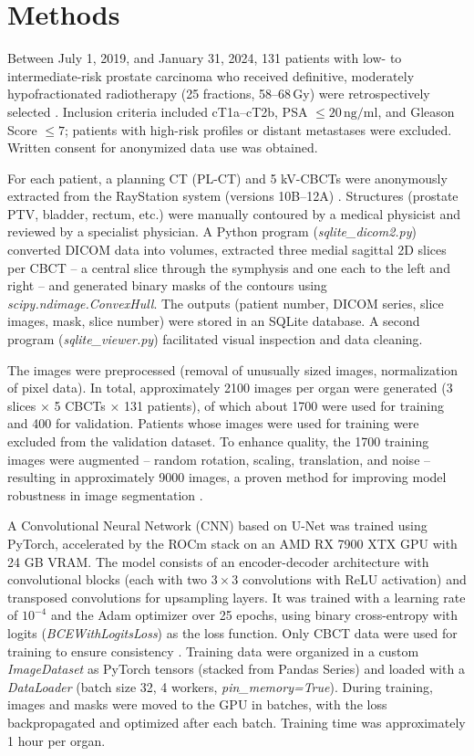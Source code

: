 \documentclass{article}
\begin{document}
\section{Methods}
Between July 1, 2019, and January 31, 2024, 131 patients with low- to
intermediate-risk prostate carcinoma who received definitive, moderately
hypofractionated radiotherapy (25 fractions, 58–68\,Gy) were retrospectively
selected \citep{ethik2024}. Inclusion criteria included cT1a–cT2b, PSA \(\leq
20\,\text{ng/ml}\), and Gleason Score \(\leq 7\); patients with high-risk
profiles or distant metastases were excluded. Written consent for anonymized
data use was obtained.

For each patient, a planning CT (PL-CT) and 5 kV-CBCTs were anonymously
extracted from the RayStation system (versions 10B–12A) \citep{zwart2022}.
Structures (prostate PTV, bladder, rectum, etc.) were manually contoured by a
medical physicist and reviewed by a specialist physician. A Python program
(\textit{sqlite\_dicom2.py}) converted DICOM data into volumes, extracted three
medial sagittal 2D slices per CBCT – a central slice through the symphysis and
one each to the left and right – and generated binary masks of the contours
using \textit{scipy.ndimage.ConvexHull}. The outputs (patient number, DICOM
series, slice images, mask, slice number) were stored in an SQLite database. A
second program (\textit{sqlite\_viewer.py}) facilitated visual inspection and
data cleaning.

The images were preprocessed (removal of unusually sized images, normalization
of pixel data). In total, approximately 2100 images per organ were generated (3
slices × 5 CBCTs × 131 patients), of which about 1700 were used for training and
400 for validation. Patients whose images were used for training were excluded
from the validation dataset. To enhance quality, the 1700 training images were
augmented – random rotation, scaling, translation, and noise – resulting in
approximately 9000 images, a proven method for improving model robustness in
image segmentation \citep{ronneberger2015, pereira2016, shorten2019}.

A Convolutional Neural Network (CNN) based on U-Net \citep{ronneberger2015} was
trained using PyTorch, accelerated by the ROCm stack on an AMD RX 7900 XTX GPU
with 24 GB VRAM. The model consists of an encoder-decoder architecture with
convolutional blocks (each with two \(3 \times 3\) convolutions with ReLU
activation) and transposed convolutions for upsampling layers. It was trained
with a learning rate of \(10^{-4}\) and the Adam optimizer over 25 epochs, using
binary cross-entropy with logits (\textit{BCEWithLogitsLoss}) as the loss
function. Only CBCT data were used for training to ensure consistency
\citep{litjens2017}. Training data were organized in a custom
\textit{ImageDataset} as PyTorch tensors (stacked from Pandas Series) and loaded
with a \textit{DataLoader} (batch size 32, 4 workers,
\textit{pin\_memory=True}). During training, images and masks were moved to the
GPU in batches, with the loss backpropagated and optimized after each batch.
Training time was approximately 1 hour per organ.
\end{document}
